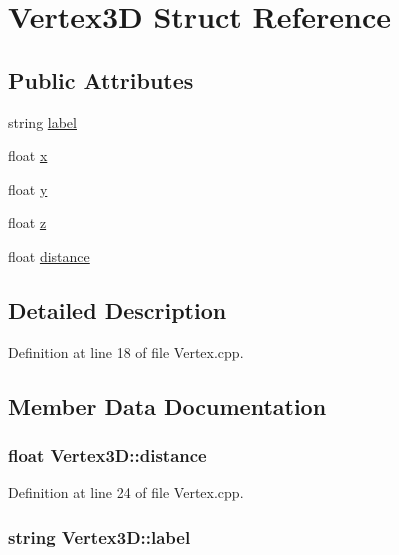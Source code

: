 \hypertarget{struct_vertex3_d}{}\section{Vertex3D Struct Reference}
\label{struct_vertex3_d}
\subsection*{Public Attributes}
\begin{DoxyCompactItemize}
\item 
string \hyperlink{struct_vertex3_d_a4b0958099770a13662a0b4f95bccf4ff}{label}
\item 
float \hyperlink{struct_vertex3_d_a31874fac8de9ea8aa004f7d62c3b0a82}{x}
\item 
float \hyperlink{struct_vertex3_d_acc2ceb770e03d6facf4c921de0eaf3d8}{y}
\item 
float \hyperlink{struct_vertex3_d_af04a23eeeea792a53123e2d622395f8f}{z}
\item 
float \hyperlink{struct_vertex3_d_aba4baf3fd67dd3668a921b1030d089dd}{distance}
\end{DoxyCompactItemize}


\subsection{Detailed Description}


Definition at line 18 of file Vertex.\+cpp.



\subsection{Member Data Documentation}
\subsubsection[{\texorpdfstring{distance}{distance}}]{\setlength{\rightskip}{0pt plus 5cm}float Vertex3\+D\+::distance}\hypertarget{struct_vertex3_d_aba4baf3fd67dd3668a921b1030d089dd}{}\label{struct_vertex3_d_aba4baf3fd67dd3668a921b1030d089dd}


Definition at line 24 of file Vertex.\+cpp.

\subsubsection[{\texorpdfstring{label}{label}}]{\setlength{\rightskip}{0pt plus 5cm}string Vertex3\+D\+::label}\hypertarget{struct_vertex3_d_a4b0958099770a13662a0b4f95bccf4ff}{}\label{struct_vertex3_d_a4b0958099770a13662a0b4f95bccf4ff}


